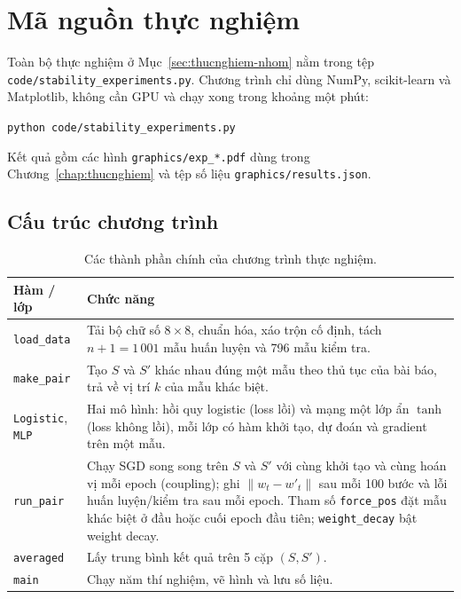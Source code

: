 \chapter{Mã nguồn thực nghiệm}
\label{app:code}

Toàn bộ thực nghiệm ở Mục~\ref{sec:thucnghiem-nhom} nằm trong tệp\\ \texttt{code/stability\_experiments.py}. Chương trình chỉ dùng NumPy, scikit-learn và Matplotlib, không cần GPU và chạy xong trong khoảng một phút:
\begin{center}
\texttt{python code/stability\_experiments.py}
\end{center}
Kết quả gồm các hình \texttt{graphics/exp\_*.pdf} dùng trong Chương~\ref{chap:thucnghiem} và tệp số liệu \texttt{graphics/results.json}.

\section{Cấu trúc chương trình}

\begin{table}[H]
\centering
\caption{Các thành phần chính của chương trình thực nghiệm.}
\label{tab:code}
\begin{tabular}{|p{3.6cm}|p{9.6cm}|}
\hline
\textbf{Hàm / lớp} & \textbf{Chức năng} \\ \hline
\texttt{load\_data} & Tải bộ chữ số $8\times 8$, chuẩn hóa, xáo trộn cố định, tách $n + 1 = 1\,001$ mẫu huấn luyện và 796 mẫu kiểm tra. \\ \hline
\texttt{make\_pair} & Tạo $S$ và $S'$ khác nhau đúng một mẫu theo thủ tục của bài báo, trả về vị trí $k$ của mẫu khác biệt. \\ \hline
\texttt{Logistic}, \texttt{MLP} & Hai mô hình: hồi quy logistic (loss lồi) và mạng một lớp ẩn $\tanh$ (loss không lồi), mỗi lớp có hàm khởi tạo, dự đoán và gradient trên một mẫu. \\ \hline
\texttt{run\_pair} & Chạy SGD song song trên $S$ và $S'$ với cùng khởi tạo và cùng hoán vị mỗi epoch (coupling); ghi $\|w_t - w'_t\|$ sau mỗi 100 bước và lỗi huấn luyện/kiểm tra sau mỗi epoch. Tham số \texttt{force\_pos} đặt mẫu khác biệt ở đầu hoặc cuối epoch đầu tiên; \texttt{weight\_decay} bật weight decay. \\ \hline
\texttt{averaged} & Lấy trung bình kết quả trên 5 cặp $(S, S')$. \\ \hline
\texttt{main} & Chạy năm thí nghiệm, vẽ hình và lưu số liệu. \\ \hline
\end{tabular}
\end{table}

